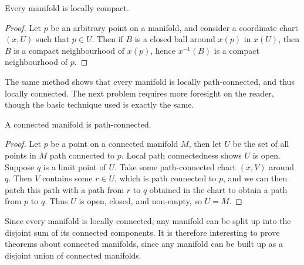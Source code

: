 \begin{theorem}
    Every manifold is locally compact.
\end{theorem}
\begin{proof}
    Let $p$ be an arbitrary point on a manifold, and consider a coordinate chart $(x,U)$ such that $p \in U$. Then if $B$ is a closed ball around $x(p)$ in $x(U)$, then $B$ is a compact neighbourhood of $x(p)$, hence $x^{-1}(B)$ is a compact neighbourhood of $p$.
\end{proof}

The same method shows that every manifold is locally path-connected, and thus locally connected. The next problem requires more foresight on the reader, though the basic technique used is exactly the same.

\begin{theorem}
    A connected manifold is path-connected.
\end{theorem}
\begin{proof}
    Let $p$ be a point on a connected manifold $M$, then let $U$ be the set of all points in $M$ path connected to $p$. Local path connectedness shows $U$ is open. Suppose $q$ is a limit point of $U$. Take some path-connected chart $(x,V)$ around $q$. Then $V$ contains some $r \in U$, which is path connected to $p$, and we can then patch this path with a path from $r$ to $q$ obtained in the chart to obtain a path from $p$ to $q$. Thus $U$ is open, closed, and non-empty, so $U = M$.
\end{proof}

Since every manifold is locally connected, any manifold can be split up into the disjoint sum of its connected components. It is therefore interesting to prove theorems about connected manifolds, since any manifold can be built up as a disjoint union of connected manifolds.

